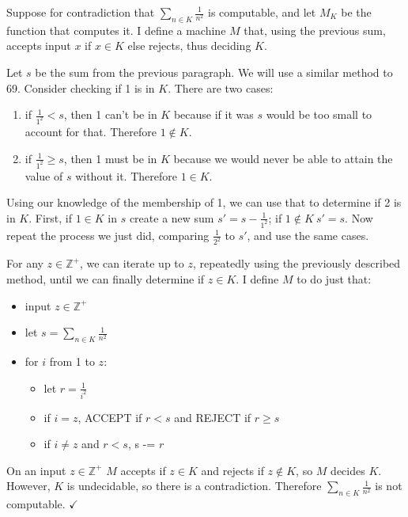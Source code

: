 \documentclass[11pt]{article}
\begin{document}
Suppose for contradiction that $\sum _{n \in K} \frac{1}{n^2}$ is computable, and let $M_K$ be the function that computes it.
I define a machine $M$ that, using the previous sum, accepts input $x$ if $x \in K$ else rejects, thus deciding $K$.

Let $s$ be the sum from the previous paragraph.
We will use a similar method to 69.
Consider checking if 1 is in $K$. There are two cases:
\begin{enumerate}
	\item if $\frac{1}{1^2} < s$, then 1 can't be in $K$ because if it was $s$ would be too small to account for that. 
	Therefore $1 \notin K$.
	\item if $\frac{1}{1^2} \geq s$, then 1 must be in $K$ because we would never be able to attain the value of $s$ without it.
	Therefore $1 \in K$.
\end{enumerate}
Using our knowledge of the membership of 1, we can use that to determine if 2 is in $K$.
First, if $1 \in K$ in $s$ create a new sum $s' = s - \frac{1}{1^2}$; if $1 \notin K\ s' = s$.
Now repeat the process we just did, comparing $\frac{1}{2^2}$ to $s'$, and use the same cases.

For any $z \in \mathbb{Z}^+$, we can iterate up to $z$, repeatedly using the previously described method, until we can finally determine if $z \in K$.
I define $M$ to do just that:
\begin{itemize}
	\item input $z \in \mathbb{Z}^+$
	\item let $s = \sum _{n\in K} \frac{1}{n^2}$
	\item for $i$ from 1 to $z$:
	\begin{itemize}
		\item let $r = \frac{1}{i^2}$
		\item if $i = z$, ACCEPT if $r < s$ and REJECT if $r \geq s$
		\item if $i \neq z$ and $r < s$, s -= $r$
	\end{itemize}
\end{itemize}

On an input $z \in \mathbb{Z}^+$ $M$ accepts if $z \in K$ and rejects if $z \notin K$, so $M$ decides $K$.
However, $K$ is undecidable, so there is a contradiction.
Therefore $\sum _{n \in K} \frac{1}{n^2}$ is not computable. $\checkmark$
\end{document}

